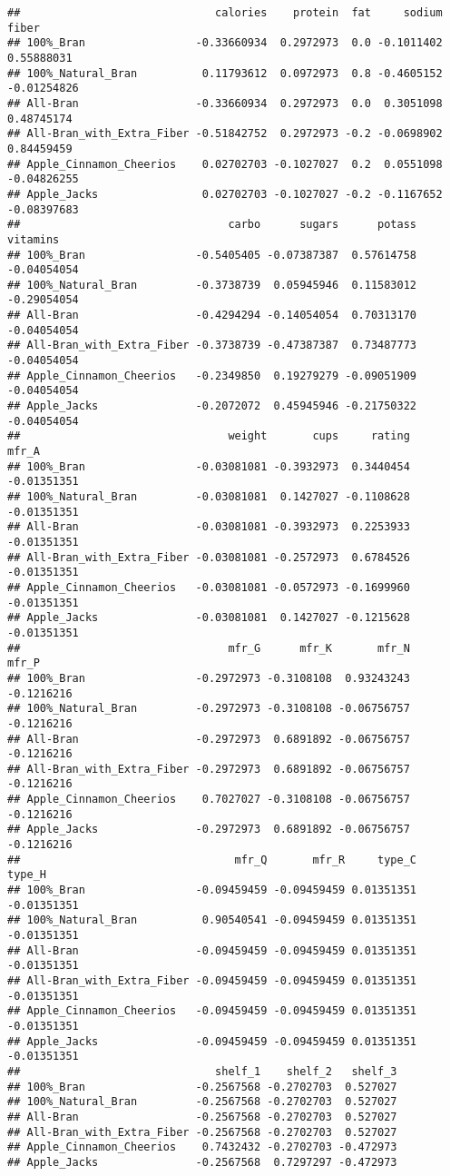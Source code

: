 \documentclass[
]{article}
\begin{document}
\begin{verbatim}
##                              calories    protein  fat     sodium       fiber
## 100%_Bran                 -0.33660934  0.2972973  0.0 -0.1011402  0.55888031
## 100%_Natural_Bran          0.11793612  0.0972973  0.8 -0.4605152 -0.01254826
## All-Bran                  -0.33660934  0.2972973  0.0  0.3051098  0.48745174
## All-Bran_with_Extra_Fiber -0.51842752  0.2972973 -0.2 -0.0698902  0.84459459
## Apple_Cinnamon_Cheerios    0.02702703 -0.1027027  0.2  0.0551098 -0.04826255
## Apple_Jacks                0.02702703 -0.1027027 -0.2 -0.1167652 -0.08397683
##                                carbo      sugars      potass    vitamins
## 100%_Bran                 -0.5405405 -0.07387387  0.57614758 -0.04054054
## 100%_Natural_Bran         -0.3738739  0.05945946  0.11583012 -0.29054054
## All-Bran                  -0.4294294 -0.14054054  0.70313170 -0.04054054
## All-Bran_with_Extra_Fiber -0.3738739 -0.47387387  0.73487773 -0.04054054
## Apple_Cinnamon_Cheerios   -0.2349850  0.19279279 -0.09051909 -0.04054054
## Apple_Jacks               -0.2072072  0.45945946 -0.21750322 -0.04054054
##                                weight       cups     rating       mfr_A
## 100%_Bran                 -0.03081081 -0.3932973  0.3440454 -0.01351351
## 100%_Natural_Bran         -0.03081081  0.1427027 -0.1108628 -0.01351351
## All-Bran                  -0.03081081 -0.3932973  0.2253933 -0.01351351
## All-Bran_with_Extra_Fiber -0.03081081 -0.2572973  0.6784526 -0.01351351
## Apple_Cinnamon_Cheerios   -0.03081081 -0.0572973 -0.1699960 -0.01351351
## Apple_Jacks               -0.03081081  0.1427027 -0.1215628 -0.01351351
##                                mfr_G      mfr_K       mfr_N      mfr_P
## 100%_Bran                 -0.2972973 -0.3108108  0.93243243 -0.1216216
## 100%_Natural_Bran         -0.2972973 -0.3108108 -0.06756757 -0.1216216
## All-Bran                  -0.2972973  0.6891892 -0.06756757 -0.1216216
## All-Bran_with_Extra_Fiber -0.2972973  0.6891892 -0.06756757 -0.1216216
## Apple_Cinnamon_Cheerios    0.7027027 -0.3108108 -0.06756757 -0.1216216
## Apple_Jacks               -0.2972973  0.6891892 -0.06756757 -0.1216216
##                                 mfr_Q       mfr_R     type_C      type_H
## 100%_Bran                 -0.09459459 -0.09459459 0.01351351 -0.01351351
## 100%_Natural_Bran          0.90540541 -0.09459459 0.01351351 -0.01351351
## All-Bran                  -0.09459459 -0.09459459 0.01351351 -0.01351351
## All-Bran_with_Extra_Fiber -0.09459459 -0.09459459 0.01351351 -0.01351351
## Apple_Cinnamon_Cheerios   -0.09459459 -0.09459459 0.01351351 -0.01351351
## Apple_Jacks               -0.09459459 -0.09459459 0.01351351 -0.01351351
##                              shelf_1    shelf_2   shelf_3
## 100%_Bran                 -0.2567568 -0.2702703  0.527027
## 100%_Natural_Bran         -0.2567568 -0.2702703  0.527027
## All-Bran                  -0.2567568 -0.2702703  0.527027
## All-Bran_with_Extra_Fiber -0.2567568 -0.2702703  0.527027
## Apple_Cinnamon_Cheerios    0.7432432 -0.2702703 -0.472973
## Apple_Jacks               -0.2567568  0.7297297 -0.472973
\end{verbatim}
\end{document}
